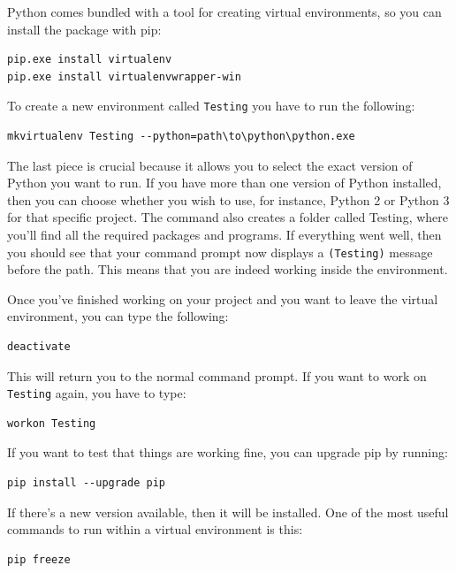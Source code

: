 Python comes bundled with a tool for creating virtual environments, so you can install the package with pip:

\begin{verbatim}
pip.exe install virtualenv
pip.exe install virtualenvwrapper-win
\end{verbatim}

To create a new environment called \texttt{Testing} you have to run the following:

\begin{verbatim}
mkvirtualenv Testing --python=path\to\python\python.exe
\end{verbatim}

The last piece is crucial because it allows you to select the exact version of Python you want to run. If you have more than one version of Python installed, then you can choose whether you wish to use, for instance, Python 2 or Python 3 for that specific project. The command also creates a folder called Testing, where you'll find all the required packages and programs. If everything went well, then you should see that your command prompt now displays a \texttt{(Testing)} message before the path. This means that you are indeed working inside the environment.

Once you've finished working on your project and you want to leave the virtual environment, you can type the following:

\begin{verbatim}
deactivate
\end{verbatim}

This will return you to the normal command prompt. If you want to work on \texttt{Testing} again, you have to type:

\begin{verbatim}
workon Testing
\end{verbatim}

If you want to test that things are working fine, you can upgrade pip by running:

\begin{verbatim}
pip install --upgrade pip
\end{verbatim}

If there's a new version available, then it will be installed. One of the most useful commands to run within a virtual environment is this:

\begin{verbatim}
pip freeze
\end{verbatim}

